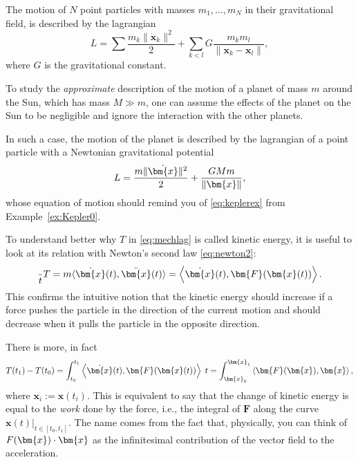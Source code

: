 \documentclass[english,fontsize=11pt,paper=a5,oneside]{scrbook}
\newcommand{\bx}{\bm{x}}
\newcommand{\lag}{\langle}
\newcommand{\rag}{\rangle}
\let\d\relax
\newcommand{\d}{\mathrm{d}}
\theoremstyle{definition}
\newenvironment{example}
  {\pushQED{\qed}\renewcommand{\qedsymbol}{$\lozenge$}\examplex}
  {\popQED\endexamplex}
\begin{document}
\begin{example}\label{ex:kepler1}
  The motion of $N$ point particles with masses $m_1, \ldots, m_N$ in their gravitational field, is described by the lagrangian
  \begin{equation}
    L = \sum\frac{m_k \|\dot{\bx}_k\|^2}{2} + \sum_{k < l} G \frac{m_k m_l}{\|\bx_k - \bx_l\|},
  \end{equation}
  where $G$ is the gravitational constant.

  To study the \emph{approximate} description of the motion of a planet of mass $m$ around the Sun, which has mass $M \gg m$, one can assume the effects of the planet on the Sun to be negligible and ignore the interaction with the other planets.

  In such a case, the motion of the planet is described by the lagrangian of a point particle with a Newtonian gravitational potential
  \begin{equation}
    L = \frac{m\|\dot\bx\|^2}{2} + \frac{G M m}{\|\bx\|},
  \end{equation}
  whose equation of motion should remind you of \eqref{eq:keplerex} from Example~\ref{ex:Kepler0}.
\end{example}

To understand better why $T$ in \eqref{eq:mechlag} is called kinetic energy, it is useful to look at its relation with Newton's second law \eqref{eq:newton2}:
\begin{equation}
  \frac{\d}{\d t} T
  = m \lag\dot \bx(t), \ddot \bx(t)\rag
  = \left\lag\dot \bx(t), \bm{F}(\bx(t))\right\rag.
\end{equation}
This confirms the intuitive notion that the kinetic energy should increase if a force pushes the particle in the direction of the current motion and should decrease when it pulls the particle in the opposite direction.

There is more, in fact
\begin{equation}
  T(t_1) - T(t_0) = \int_{t_0}^{t_1} \left\lag\dot \bx(t), \bm{F}(\bx(t))\right\rag\; \d t = \int_{\bx_0}^{\bx_1} \left\lag\bm{F}(\bx), \d \bx\right\rag,
\end{equation}
where $\bx_i := \bx(t_i)$.
This is equivalent to say that the change of kinetic energy is equal to the \emph{work} done by the force, i.e., the integral of $\bm{F}$ along the curve $\bx(t)|_{t\in[t_0, t_1]}$. The name comes from the fact that, physically, you can think of $F(\bx) \cdot \d\bx$ as the infinitesimal contribution of the vector field to the acceleration.
\end{document}
